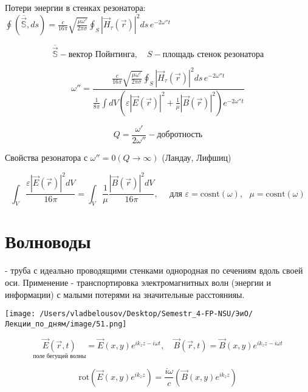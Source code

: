 \documentclass[12pt, a4paper]{report}
\begin{document}
Потери энергии в стенках резонатора: \( \displaystyle \oint \left( \overline{\vec{\mathbb{S}} },ds \right)   = \frac{c}{ 16 \pi}  \sqrt{\frac{ \mu \omega '}{2 \pi \sigma} } \oint_{S} \left\lvert \vec{H } _{\tau } (\vec{r})   \right\rvert ^2 ds \,  e^{ - 2 \omega '' t} \) 

\[  \overline{\vec{\mathbb{S}}}   - \text{вектор Пойнтинга} , \quad S - \text{площадь стенок резонатора}   \] 

\[ \omega ''  = \frac{\frac{c}{ 16 \pi } \sqrt{\frac{ \mu \omega' }{2 \pi \sigma} } \displaystyle  \oint _{S} \left\lvert \vec{H } _{\tau } (\vec{r})   \right\rvert ^2 ds \, e^{- 2 \omega '' t}}{ \frac{1}{8 \pi } \displaystyle \int dV \left(  \varepsilon \left\lvert \vec{E } (\vec{r } ) \right\rvert ^2 + \frac{1}{\mu} \left\lvert \vec{B } (\vec{r } ) \right\rvert  ^2 \right)e^{- 2 \omega '' t} }   \] 

\[ Q = \frac{ \omega ' }{2  \omega '' } - \text{добротность}   \] 

Свойства резонатора с \( \omega '' = 0 (Q \to  \infty )  \)  (Ландау, Лифшиц)

\[ \int_{V} \frac{\varepsilon \left\lvert \vec{E } (\vec{r } ) \right\rvert ^2  dV}{16 \pi} = \int_{V} \frac{1}{\mu } \frac{\left\lvert \vec{B } (\vec{r } ) \right\rvert ^2  dV}{16 \pi} ,\quad   \text{ для } \varepsilon = \mathrm{cosnt}(\omega),  \text{ } \mu = \mathrm{cosnt}(\omega)    \] 

\section{Волноводы   }

- труба с идеально проводящими стенками однородная по  сечениям вдоль своей оси. Применение - транспортировка электромагнитных волн (энергии и информации) с малыми потерями на значительные расстоянияы.

\begin{center}
    \texttt{[image: /Users/vladbelousov/Desktop/Semestr\_4-FP-NSU/ЭиО/Лекции\_по\_дням/image/51.png]}
\end{center}

\[ \underset{\text{поле бегущей волны} }{\vec{E } (\vec{r } , t )}  = \vec{E }  ( x, y ) e^{ i k_z z  - i \omega t } , \quad  \vec{B } (\vec{r }, t          )  = \vec{B }  ( x, y ) e^{ i k_z z  - i \omega t }  \] 

\[ \mathrm{rot } (\vec{E } (x,y )e^{i k_z z}) = \frac{i \omega }{c } ( \vec{B } (x,y ) e^{ i k_z z} )     \] 
\end{document}
